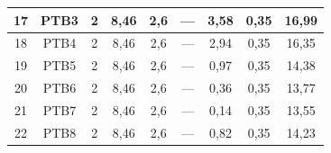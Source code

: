 \documentclass[	DIV=calc,%
							paper=a4,%
							fontsize=12pt,%
							onecolumn]{scrartcl}	 					%
\begin{document}
{\begin{tabular}{|c|c|c|c|c|c|c|c|c|}
	17                 & PTB3               & 2                                                    & 8,46                                        & 2,6                                           & ---                                           & 3,58                                             & 0,35                                            & 16,99                                                             \\ \hline
	18                 & PTB4               & 2                                                    & 8,46                                        & 2,6                                           & ---                                           & 2,94                                             & 0,35                                            & 16,35                                                             \\ \hline
	19                 & PTB5               & 2                                                    & 8,46                                        & 2,6                                           & ---                                           & 0,97                                             & 0,35                                            & 14,38                                                             \\ \hline
	20                 & PTB6               & 2                                                    & 8,46                                        & 2,6                                           & ---                                           & 0,36                                             & 0,35                                            & 13,77                                                             \\ \hline
	21                 & PTB7               & 2                                                    & 8,46                                        & 2,6                                           & ---                                           & 0,14                                             & 0,35                                            & 13,55                                                             \\ \hline
	22                 & PTB8               & 2                                                    & 8,46                                        & 2,6                                           & ---                                           & 0,82                                             & 0,35                                            & 14,23                                                             \\ \hline

\end{tabular}}
\end{document}
